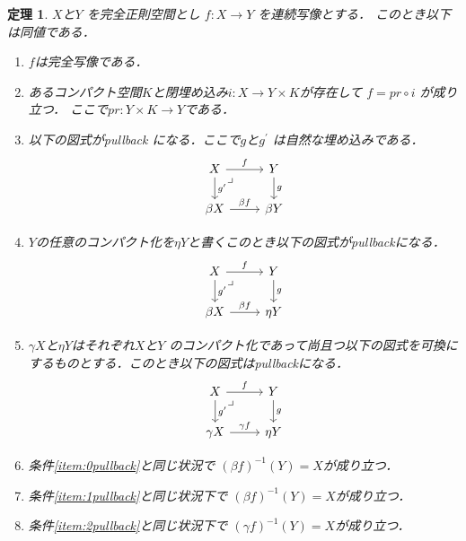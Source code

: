 \documentclass[leqno, a4paper, 12pt, dvipdfmx]{jsarticle}
\newtheorem{thm}{定理}
\begin{document}
\begin{thm}\label{thm:main3}
$X$と$Y$
を完全正則空間とし
$f\colon X\to Y$
を連続写像とする．
このとき以下は同値である．

\begin{enumerate}[label=\textup{(Q\arabic*)}]
\item\label{item:0perfect}

$f$は完全写像である．

\item\label{item:comp}
あるコンパクト空間$K$と閉埋め込み$i\colon X\to Y\times K$が存在して
$f=pr\circ i$
が成り立つ．
ここで$pr\colon Y\times K\to Y$である．

\item\label{item:0pullback}
以下の図式がpullback
になる．ここで$g$と$g^{\prime}$
は自然な埋め込みである．
\[
\begin{tikzcd}
X \arrow[r, "f"] \arrow[d, "g^{\prime}"] \arrow[dr, phantom, "\lrcorner", very near start]
& Y\arrow[d,"g"] \\
 \beta X \arrow[r,"\beta f"] & \beta Y
\end{tikzcd}
\]

\item \label{item:1pullback}
$Y$の任意のコンパクト化を$\eta Y$と書くこのとき以下の図式がpullbackになる．
\[
\begin{tikzcd}
X \arrow[r, "f"] \arrow[d, "g^{\prime}"] \arrow[dr, phantom, "\lrcorner", very near start]
& Y\arrow[d,"g"] \\
 \beta X \arrow[r,"\beta f"] & \eta Y
\end{tikzcd}
\]

\item \label{item:2pullback}
$\gamma X$と$\eta Y$はそれぞれ$X$と$Y$
のコンパクト化であって尚且つ以下の図式を可換にするものとする．このとき以下の図式はpullbackになる．
\[
\begin{tikzcd}
X \arrow[r, "f"] \arrow[d, "g^{\prime}"] \arrow[dr, phantom, "\lrcorner", very near start]
& Y\arrow[d,"g"] \\
 \gamma X \arrow[r,"\gamma f"] & \eta Y
\end{tikzcd}
\]

\item\label{item:0jouyo}
条件\ref{item:0pullback}と同じ状況で
$(\beta f)^{-1}(Y)=X$が成り立つ．

\item\label{item:1jouyo}
条件\ref{item:1pullback}と同じ状況下で
$(\beta f)^{-1}(Y)=X$が成り立つ．

\item\label{item:2jouyo}
条件\ref{item:2pullback}と同じ状況下で
$(\gamma f)^{-1}(Y)=X$が成り立つ．


\end{enumerate}
\end{thm}
\end{document}
